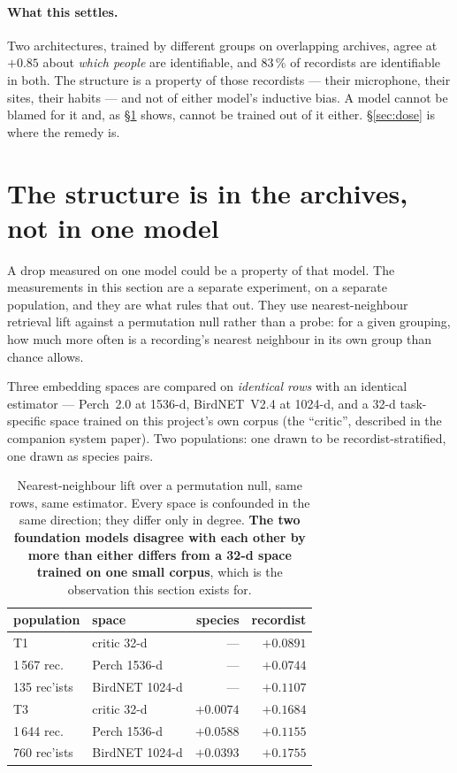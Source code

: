 \documentclass[10pt,twocolumn,a4paper]{article}
\begin{document}
\paragraph{What this settles.} Two architectures, trained by different groups on overlapping
archives, agree at $+0.85$ about \emph{which people} are identifiable, and 83\,\% of recordists are
identifiable in both. The structure is a property of those recordists --- their microphone, their
sites, their habits --- and not of either model's inductive bias. A model cannot be blamed for it
and, as \S\ref{sec:archives} shows, cannot be trained out of it either. \S\ref{sec:dose} is where
the remedy is.

\section{The structure is in the archives, not in one model}
\label{sec:archives}

A drop measured on one model could be a property of that model. The measurements in this
section are a separate experiment, on a separate population, and they are what rules that
out. They use nearest-neighbour retrieval lift against a permutation null rather than a
probe: for a given grouping, how much more often is a recording's nearest neighbour in its own
group than chance allows.

Three embedding spaces are compared on \emph{identical rows} with an identical estimator ---
Perch~2.0 at 1536-d, BirdNET~V2.4 at 1024-d, and a 32-d task-specific space trained on this
project's own corpus (the ``critic'', described in the companion system paper). Two
populations: one drawn to be recordist-stratified, one drawn as species pairs.

\begin{table}[t]
\footnotesize
\setlength{\tabcolsep}{4pt}
\caption{Nearest-neighbour lift over a permutation null, same rows, same estimator. Every
space is confounded in the same direction; they differ only in degree. \textbf{The two
foundation models disagree with each other by more than either differs from a 32-d space
trained on one small corpus}, which is the observation this section exists for.}
\label{tab:crossmodel}
\begin{tabular}{L{1.5cm} L{1.5cm} r r}
\toprule
population & space & species & recordist \\
\midrule
T1        & critic 32-d   & ---      & $+0.0891$ \\
1\,567 rec.\ & Perch 1536-d  & ---      & $+0.0744$ \\
135 rec'ists & BirdNET 1024-d & ---     & $+0.1107$ \\
\midrule
T3        & critic 32-d   & $+0.0074$ & $+0.1684$ \\
1\,644 rec.\ & Perch 1536-d  & $+0.0588$ & $+0.1155$ \\
760 rec'ists & BirdNET 1024-d & $+0.0393$ & $+0.1755$ \\
\bottomrule
\end{tabular}
\end{table}
\end{document}

